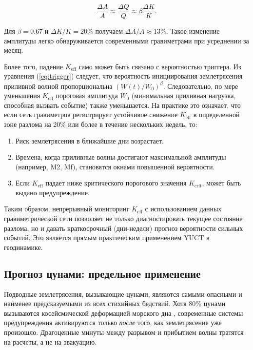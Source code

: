 \documentclass[12pt,a4paper]{article}
\theoremstyle{remark}
\begin{document}
	\[
	\frac{\Delta A}{A} \approx \frac{\Delta Q}{Q} \approx \beta \frac{\Delta K}{K}.
	\]
	
	Для \(\beta = 0.67\) и \(\Delta K/K = 20\%\) получаем \(\Delta A/A \approx 13\%\). Такое изменение амплитуды легко обнаруживается современными гравиметрами при усреднении за месяц.
	
	Более того, падение \(K_{\mathrm{eff}}\) само может быть связано с вероятностью триггера. Из уравнения (\ref{eq:trigger}) следует, что вероятность инициирования землетрясения приливной волной пропорциональна \((W(t)/W_0)^{\beta}\). Следовательно, по мере уменьшения \(K_{\mathrm{eff}}\) пороговая амплитуда \(W_0\) (минимальная приливная нагрузка, способная вызвать событие) также уменьшается. На практике это означает, что если сеть гравиметров регистрирует устойчивое снижение \(K_{\mathrm{eff}}\) в определенной зоне разлома на 20\% или более в течение нескольких недель, то:
	
	\begin{enumerate}
		\item Риск землетрясения в ближайшие дни возрастает.
		\item Времена, когда приливные волны достигают максимальной амплитуды (например, M2, Mf), становятся окнами повышенной вероятности.
		\item Если \(K_{\mathrm{eff}}\) падает ниже критического порогового значения \(K_{\text{crit}}\), может быть выдано предупреждение.
	\end{enumerate}
	
	Таким образом, непрерывный мониторинг \(K_{\mathrm{eff}}\) с использованием данных гравиметрической сети позволяет не только диагностировать текущее состояние разлома, но и давать краткосрочный (дни-недели) прогноз вероятности сильных событий. Это является прямым практическим применением YUCT в геодинамике.
	
	\subsection{Прогноз цунами: предельное применение}
	\label{sec:tsunami}
	
	Подводные землетрясения, вызывающие цунами, являются самыми опасными и наименее предсказуемыми из всех стихийных бедствий. Хотя 80\% цунами вызываются косейсмической деформацией морского дна \cite{NOAA2024, USGS2024}, современные системы предупреждения активируются только \textit{после} того, как землетрясение уже произошло. Драгоценные минуты между разрывом и прибытием волны тратятся на расчеты, а не на эвакуацию.
	
\end{document}
